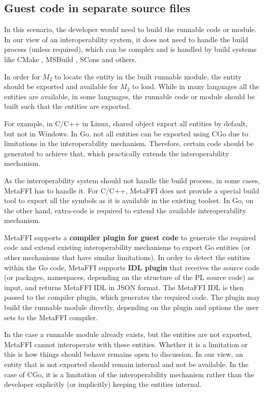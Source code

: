 \documentclass[sigplan,10pt,manuscript,nonacm]{acmart}
\begin{document}
\subsection{Guest code in separate source files} \label{sec:guest_code_in_src}
In this scenario, the developer would need to build the runnable code or module.
In our view of an interoperability system, it does not need to handle the build process (unless required), which can be complex and is handled by build systems like CMake \cite{cmake}, MSBuild \cite{msbuild}, SCons \cite{scons} and others.

In order for $M_2$ to locate the entity in the built runnable module, the entity should be exported and available for $M_2$ to load. While in many languages all the entities are available, in some languages, the runnable code or module should be built such that the entities are exported.

For example, in C/C++ in Linux, shared object export all entities by default, but not in Windows. In Go, not all entities can be exported using CGo due to limitations in the interoperability mechanism. Therefore, certain code should be generated to achieve that, which practically extends the interoperability mechanism.

As the interoperability system should not handle the build process, in some cases, MetaFFI has to handle it. For C/C++, MetaFFI does not provide a special build tool to export all the symbols as it is available in the existing toolset. In Go, on the other hand, extra-code is required to extend the available interoperability mechanism.

MetaFFI supports a \textbf{compiler plugin for guest code} to generate the required code and extend existing interoperability mechanisms to export Go entities (or other mechanisms that have similar limitations).
In order to detect the entities within the Go code, MetaFFI supports \textbf{IDL plugin} that receives the source code (or packages, namespaces, depending on the structure of the PL source code) as input, and returns MetaFFI IDL in JSON format. The MetaFFI IDL is then passed to the compiler plugin, which generates the required code. The plugin may build the runnable module directly, depending on the plugin and options the user sets to the MetaFFI compiler.

In the case a runnable module already exists, but the entities are not exported, MetaFFI cannot interoperate with these entities. Whether it is a limitation or this is how things should behave remains open to discussion. In our view, an entity that is not exported should remain internal and not be available. In the case of CGo, it is a limitation of the interoperability mechanism rather than the developer explicitly (or implicitly) keeping the entities internal.
\end{document}
